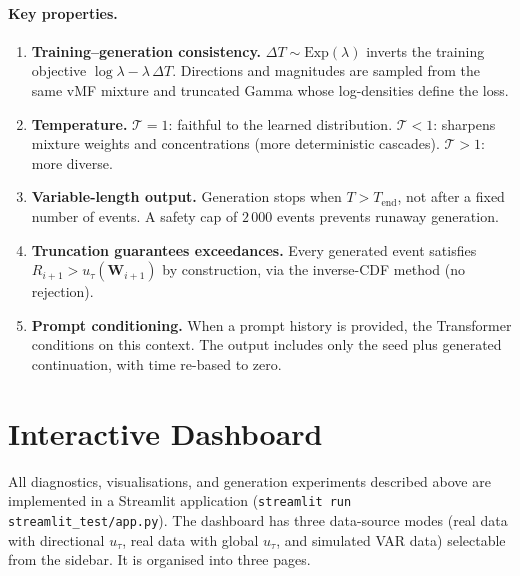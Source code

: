 \documentclass[11pt,a4paper]{article}
\newcommand{\bW}{\boldsymbol{W}}
\begin{document}
\paragraph{Key properties.}

\begin{enumerate}[nosep]
  \item \textbf{Training--generation consistency.}
        $\Delta T \sim \text{Exp}(\lambda)$ inverts the training objective
        $\log\lambda - \lambda\,\Delta T$.
        Directions and magnitudes are sampled from the same vMF mixture
        and truncated Gamma whose log-densities define the loss.

  \item \textbf{Temperature.}
        $\mathcal{T} = 1$: faithful to the learned distribution.
        $\mathcal{T} < 1$: sharpens mixture weights and concentrations
        (more deterministic cascades).
        $\mathcal{T} > 1$: more diverse.

  \item \textbf{Variable-length output.}
        Generation stops when $T > T_{\text{end}}$, not after a fixed
        number of events.  A safety cap of $2\,000$ events prevents
        runaway generation.

  \item \textbf{Truncation guarantees exceedances.}
        Every generated event satisfies $R_{i+1} > u_\tau(\bW_{i+1})$
        by construction, via the inverse-CDF method (no rejection).

  \item \textbf{Prompt conditioning.}
        When a prompt history is provided, the Transformer conditions
        on this context.  The output includes only the seed plus
        generated continuation, with time re-based to zero.
\end{enumerate}

\section{Interactive Dashboard}\label{sec:dashboard}

All diagnostics, visualisations, and generation experiments described
above are implemented in a Streamlit application
(\texttt{streamlit run streamlit\_test/app.py}).
The dashboard has three data-source modes
(real data with directional $u_\tau$, real data with global $u_\tau$,
and simulated VAR data) selectable from the sidebar.
It is organised into three pages.
\end{document}
